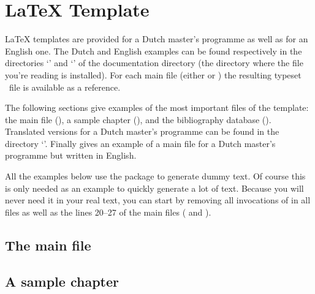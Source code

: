 \newcommand*\showtemplatefile[1]{%
  \begingroup
    \setverbatimfont{\normalfont\ttfamily\footnotesize}%
    \bvperpagefalse
    \linenumberfrequency{1}\resetbvlinenumber
    \linenumberfont{\rmfamily\tiny}%
    \bvnumbersoutside
    \renewcommand*\bvtoprulehook{%
      \hrule width\linewidth \nobreak
      \hbox to\linewidth{%
        \hss \smash{\colorbox[gray]{.9}{%
            \ttfamily \enspace template/#1\enspace}}\qquad}%
      \nobreak\vskip-.1pt\nobreak\vskip-\lineskip\relax}%
    \boxedverbatiminput{#1}%
    \tracingnone
  \endgroup}

\chapter{LaTeX Template}
\label{app:template}
LaTeX templates are provided for a Dutch master's programme as well as for an
English one. The Dutch and English examples can be found respectively in the
directories `' and `' of the documentation
directory (the directory where the file you're reading is installed). For each
main file (either  or ) the resulting
typeset \PDF\ file is available as a reference.

The following sections give examples of the most important files of the
template: the main file (), a sample chapter
(), and the bibliography database ().
Translated versions for a Dutch master's programme can be found in the directory
`'. Finally  gives an example of a main
file for a Dutch master's programme but written in English.

All the examples below use the  package to generate dummy text.
Of course this is only needed as an example to quickly generate a lot of
text. Because you will never need it in your real text, you can start by
removing all invocations of  in all files as well as the lines
20--27 of the main files ( and ).

\section{The main file}
\label{sec:file:main}
\showtemplatefile{thesis.tex}

\section{A sample chapter}
\label{sec:file:chap}
\showtemplatefile{chapter-1.tex}


